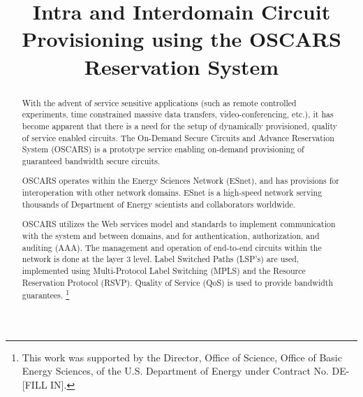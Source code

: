 \documentclass[conference]{IEEEtran}
\begin{document}
\title{Intra and Interdomain Circuit Provisioning using the OSCARS Reservation System}

% 
\author{
}

\maketitle

\begin{abstract}
With the advent of service sensitive applications (such as remote controlled 
experiments, time constrained massive data transfers, video-conferencing, etc.),
it has become apparent that there is a need for the setup of dynamically 
provisioned, quality of service enabled circuits.
The On-Demand Secure Circuits and Advance Reservation System (OSCARS) is 
a prototype service enabling on-demand provisioning of guaranteed bandwidth 
secure circuits.

OSCARS operates within the Energy Sciences Network (ESnet), and has
provisions for interoperation with other network domains.
ESnet is a high-speed network serving thousands 
of Department of Energy scientists and collaborators worldwide.

OSCARS utilizes the Web services model and standards to implement communication
with the system and between domains, and for authentication, authorization,
and auditing (AAA).  The management and operation of end-to-end circuits 
within the network is done at the layer 3 level.  Label Switched Paths 
(LSP's) are used, implemented using Multi-Protocol Label Switching (MPLS) and 
the Resource Reservation Protocol (RSVP). Quality of Service (QoS) is used to 
provide bandwidth guarantees.
\footnote{
This work was supported by the Director, Office of Science, Office of 
Basic Energy Sciences, of the U.S. Department of Energy under Contract No. 
DE-[FILL IN].}
\end{abstract}


\IEEEpeerreviewmaketitle
\end{document}
